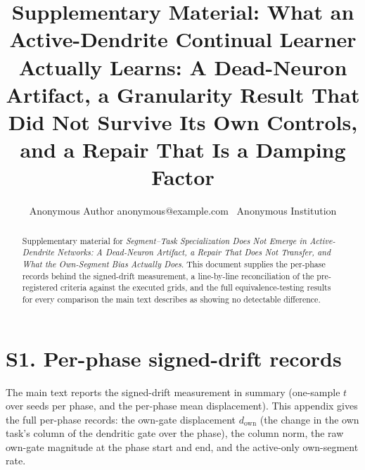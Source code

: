\documentclass[10pt]{article}
\begin{document}
\title{Supplementary Material: What an Active-Dendrite Continual Learner
Actually Learns: A Dead-Neuron Artifact, a Granularity Result That Did Not
Survive Its Own Controls, and a Repair That Is a Damping Factor}
\author{\name Anonymous Author \email anonymous@example.com \ \addr Anonymous Institution}
\maketitle
\begin{abstract}
Supplementary material for \emph{Segment--Task Specialization Does Not
Emerge in Active-Dendrite Networks: A Dead-Neuron Artifact, a Repair That
Does Not Transfer, and What the Own-Segment Bias Actually Does}. This
document supplies the per-phase records behind the signed-drift
measurement, a line-by-line reconciliation of the pre-registered criteria
against the executed grids, and the full equivalence-testing results for
every comparison the main text describes as showing no detectable
difference.
\end{abstract}

\section{S1. Per-phase signed-drift records}
\noindent The main text reports the signed-drift measurement in summary
(one-sample $t$ over seeds per phase, and the per-phase mean displacement).
This appendix gives the full per-phase records: the own-gate displacement
$d_{\mathrm{own}}$ (the change in the own task's column of the dendritic
gate over the phase), the column norm, the raw own-gate magnitude at the
phase start and end, and the active-only own-segment rate.
\end{document}
